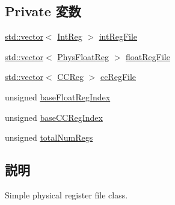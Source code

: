 \subsection*{Private 変数}
\begin{DoxyCompactItemize}
\item 
\hyperlink{classstd_1_1vector}{std::vector}$<$ \hyperlink{classPhysRegFile_a1355cb78d031430d4d70eb5080267604}{IntReg} $>$ \hyperlink{classPhysRegFile_a65b23a22006c5cf9aed0fadb3d764c34}{intRegFile}
\item 
\hyperlink{classstd_1_1vector}{std::vector}$<$ \hyperlink{unionPhysRegFile_1_1PhysFloatReg}{PhysFloatReg} $>$ \hyperlink{classPhysRegFile_a343937a7a6cc0c222be87f51add84a18}{floatRegFile}
\item 
\hyperlink{classstd_1_1vector}{std::vector}$<$ \hyperlink{classPhysRegFile_a0c9de550a32808e6a25b54b6c791d5ab}{CCReg} $>$ \hyperlink{classPhysRegFile_af4b24547ef531657fa5164d3acb7e702}{ccRegFile}
\item 
unsigned \hyperlink{classPhysRegFile_ae54df58d8a2e2386ef1bafe11fafc0ca}{baseFloatRegIndex}
\item 
unsigned \hyperlink{classPhysRegFile_a8c5dd07dce95e47721d3a10eb0d48865}{baseCCRegIndex}
\item 
unsigned \hyperlink{classPhysRegFile_ae81cfbdd726e306beca09f7e80eb5cdb}{totalNumRegs}
\end{DoxyCompactItemize}


\subsection{説明}
Simple physical register file class. 

